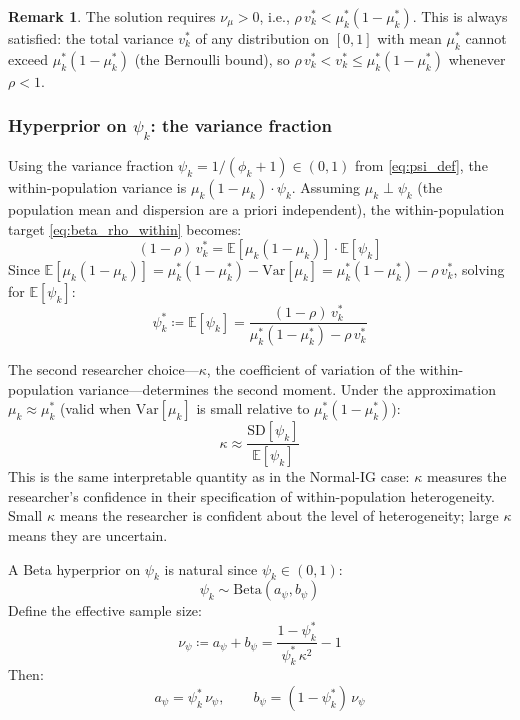 \documentclass[11pt,a4paper]{article}
\theoremstyle{definition}
\newtheorem{remark}[theorem]{Remark}
\newcommand{\E}{\mathbb{E}}
\newcommand{\Var}{\mathrm{Var}}
\begin{document}
\begin{remark}
The solution requires $\nu_\mu > 0$, i.e.,
$\rho \, v_k^* < \mu_k^*(1-\mu_k^*)$. This is always satisfied: the total
variance $v_k^*$ of any distribution on $[0,1]$ with mean $\mu_k^*$ cannot
exceed $\mu_k^*(1-\mu_k^*)$ (the Bernoulli bound), so
$\rho \, v_k^* < v_k^* \leq \mu_k^*(1-\mu_k^*)$ whenever $\rho < 1$.
\end{remark}

\subsubsection{Hyperprior on $\psi_k$: the variance fraction}

Using the variance fraction $\psi_k = 1/(\phi_k + 1) \in (0,1)$ from
\eqref{eq:psi_def}, the within-population variance is
$\mu_k(1-\mu_k) \cdot \psi_k$. Assuming $\mu_k \perp \psi_k$ (the population
mean and dispersion are a priori independent), the within-population target
\eqref{eq:beta_rho_within} becomes:
\begin{equation}
    (1-\rho) \, v_k^*
    = \E[\mu_k(1-\mu_k)] \cdot \E[\psi_k]
\end{equation}
Since $\E[\mu_k(1-\mu_k)] = \mu_k^*(1-\mu_k^*) - \Var[\mu_k]
= \mu_k^*(1-\mu_k^*) - \rho \, v_k^*$, solving for $\E[\psi_k]$:
\begin{equation}
    \label{eq:psi_target}
    \psi_k^* \coloneqq \E[\psi_k]
    = \frac{(1-\rho) \, v_k^*}{\mu_k^*(1-\mu_k^*) - \rho \, v_k^*}
\end{equation}

The second researcher choice---$\kappa$, the coefficient of variation of the
within-population variance---determines the second moment. Under the
approximation $\mu_k \approx \mu_k^*$ (valid when $\Var[\mu_k]$ is small
relative to $\mu_k^*(1-\mu_k^*)$):
\begin{equation}
    \kappa \approx \frac{\mathrm{SD}[\psi_k]}{\E[\psi_k]}
\end{equation}
This is the same interpretable quantity as in the Normal-IG case: $\kappa$
measures the researcher's confidence in their specification of
within-population heterogeneity. Small $\kappa$ means the researcher is
confident about the level of heterogeneity; large $\kappa$ means they are
uncertain.

A Beta hyperprior on $\psi_k$ is natural since $\psi_k \in (0,1)$:
\begin{equation}
    \psi_k \sim \mathrm{Beta}(a_\psi, b_\psi)
\end{equation}
Define the effective sample size:
\begin{equation}
    \label{eq:nu_psi}
    \nu_\psi \coloneqq a_\psi + b_\psi
    = \frac{1 - \psi_k^*}{\psi_k^* \, \kappa^2} - 1
\end{equation}
Then:
\begin{equation}
    \label{eq:beta_hyper_psi}
    a_\psi = \psi_k^* \, \nu_\psi, \qquad
    b_\psi = (1-\psi_k^*) \, \nu_\psi
\end{equation}
\end{document}
